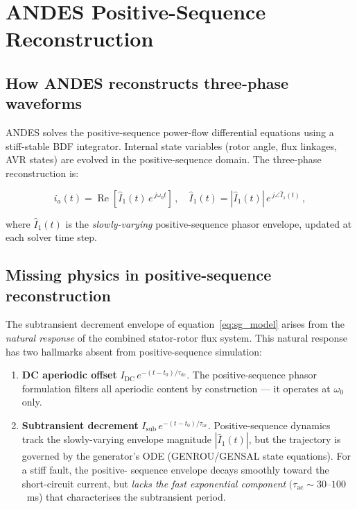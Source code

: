 \documentclass[11pt,a4paper]{article}
\newcommand{\Isub}{I_{\text{sub}}}
\newcommand{\tauac}{\tau_{\text{ac}}}
\newcommand{\taudc}{\tau_{\text{dc}}}
\begin{document}
\section{ANDES Positive-Sequence Reconstruction}
\label{sec:andes_model}

\subsection{How ANDES reconstructs three-phase waveforms}

ANDES solves the positive-sequence power-flow differential equations
using a stiff-stable BDF integrator.  Internal state variables (rotor
angle, flux linkages, AVR states) are evolved in the positive-sequence
domain.  The three-phase reconstruction is:

\begin{equation}
  i_a(t) = \operatorname{Re}\!\left[\hat{I}_1(t)\,e^{\,j\omega_0 t}\right]\,,
  \quad
  \hat{I}_1(t) = |\hat{I}_1(t)|\,e^{\,j\angle\hat{I}_1(t)}\,,
  \label{eq:phasor_recon}
\end{equation}

\noindent where $\hat{I}_1(t)$ is the \emph{slowly-varying} positive-sequence
phasor envelope, updated at each solver time step.

\subsection{Missing physics in positive-sequence reconstruction}

The subtransient decrement envelope of equation~\eqref{eq:sg_model} arises
from the \emph{natural response} of the combined stator-rotor flux system.
This natural response has two hallmarks absent from positive-sequence simulation:

\begin{enumerate}
  \item \textbf{DC aperiodic offset} $I_{\text{DC}}\,e^{-(t-t_0)/\taudc}$.
        The positive-sequence phasor formulation filters all aperiodic
        content by construction — it operates at $\omega_0$ only.
  \item \textbf{Subtransient decrement} $\Isub\,e^{-(t-t_0)/\tauac}$.
        Positive-sequence dynamics track the slowly-varying envelope magnitude
        $|\hat{I}_1(t)|$, but the trajectory is governed by the generator's
        ODE (GENROU/GENSAL state equations).  For a stiff fault, the positive-
        sequence envelope decays smoothly toward the short-circuit current, but
        \emph{lacks the fast exponential component} $(\tauac \sim 30\text{--}100$~ms)
        that characterises the subtransient period.
\end{enumerate}
\end{document}
